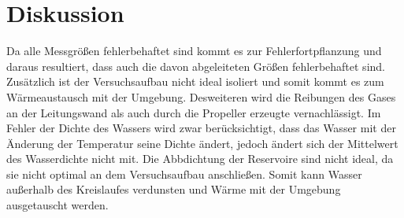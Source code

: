 \section{Diskussion}
\label{sec:Diskussion}
Da alle Messgrößen fehlerbehaftet sind kommt es zur Fehlerfortpflanzung und daraus resultiert, dass auch die davon abgeleiteten Größen fehlerbehaftet sind. Zusätzlich ist der Versuchsaufbau nicht ideal isoliert und somit kommt es zum Wärmeaustausch mit der Umgebung. Desweiteren wird die Reibungen des Gases an der Leitungswand als auch durch die Propeller erzeugte vernachlässigt. Im Fehler der Dichte des Wassers wird zwar berücksichtigt, dass das Wasser mit der Änderung der Temperatur seine Dichte ändert, jedoch ändert sich der Mittelwert des Wasserdichte nicht mit. Die Abbdichtung der Reservoire sind nicht ideal, da sie nicht optimal an dem Versuchsaufbau anschließen. Somit kann Wasser außerhalb des Kreislaufes verdunsten und Wärme mit der Umgebung ausgetauscht werden.
